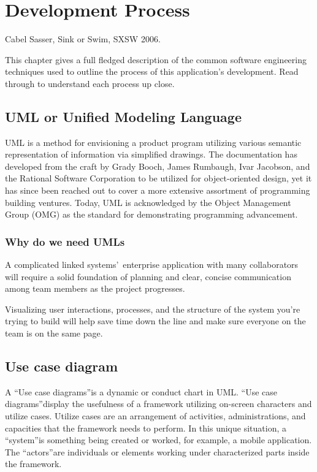 \chapter{Development Process}
\label{chap:devProcess}

\begin{epigraphs}
%
      {Cabel Sasser, Sink or Swim, SXSW 2006}.
\end{epigraphs}
This chapter gives a full fledged description of the common software engineering techniques used to outline the process of this application's development. Read through to understand each process up close.

\section {UML or Unified Modeling Language}
\label{sec:uml}
UML is a method for envisioning a product program utilizing various semantic representation of information via simplified drawings. The documentation has developed from the craft by Grady Booch, James Rumbaugh, Ivar Jacobson, and the Rational Software Corporation to be utilized for object-oriented design, yet it has since been reached out to cover a more extensive assortment of programming building ventures. Today, UML is acknowledged by the Object Management Group (OMG) as the standard for demonstrating programming advancement.

\subsection{Why do we need UMLs}
A complicated linked systems\textquoteright \ enterprise application with many collaborators will require a solid foundation of planning and clear, concise communication among team members as the project progresses.\par \medskip

Visualizing user interactions, processes, and the structure of the system you\textquoteright re trying to build will help save time down the line and make sure everyone on the team is on the same page.

\section{Use case diagram}
A \textquotedblleft Use case diagrams\textquotedblright is a dynamic or conduct chart in UML. \textquotedblleft Use case diagrams\textquotedblright display the usefulness of a framework utilizing on-screen characters and utilize cases. Utilize cases are an arrangement of activities, administrations, and capacities that the framework needs to perform. In this unique situation, a \textquotedblleft system\textquotedblright is something being created or worked, for example, a mobile application. The \textquotedblleft actors\textquotedblright are individuals or elements working under characterized parts inside the framework.

